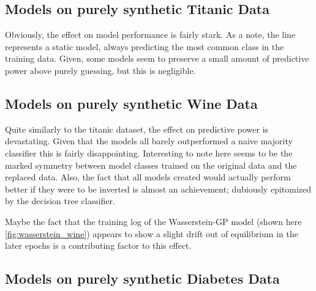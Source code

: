 \clearpage

\subsection{Models on purely synthetic Titanic Data}


Obviously, the effect on model performance is fairly stark. As a note, the line represents a static model, always predicting the most common class in the training data. Given, some models seem to preserve a small amount of predictive power above purely guessing, but this is negligible. 

\pagebreak

\subsection{Models on purely synthetic Wine Data}



Quite similarly to the titanic dataset, the effect on predictive power is devastating. Given that the models all barely outperformed a naive majority classifier this is fairly disappointing. Interesting to note here seems to be the marked symmetry between model classes trained on the original data and the replaced data. Also, the fact that all models created would actually perform better if they were to be inverted is almost an achievement; dubiously epitomized by the decision tree classifier.

Maybe the fact that the training log of the Wasserstein-GP model (shown here \ref{fig:wasserstein_wine}) appears to show a slight drift out of equilibrium in the later epochs is a contributing factor to this effect.

\pagebreak

\subsection{Models on purely synthetic Diabetes Data}


